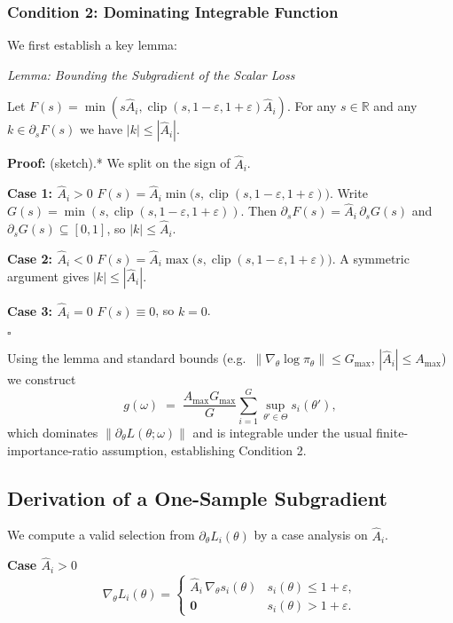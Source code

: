 \documentclass{article}
\begin{document}
\subsubsection{Condition 2: Dominating Integrable Function} 
We first establish a key lemma: 

\textit{Lemma: Bounding the Subgradient of the Scalar Loss} 

Let $F(s)=\min(s\hat{A}_i,\operatorname{clip}(s,1-\varepsilon,1+\varepsilon)\hat{A}_i)$.  
For any $s\in\mathbb{R}$ and any $k\in\partial_s F(s)$ we have $|k|\le|\hat{A}_i|$.

\textbf{Proof:} (sketch).* We split on the sign of $\hat{A}_i$.

\textbf{Case 1: $\hat{A}_i>0$}
  $F(s)=\hat{A}_i\min\!\bigl(s,\operatorname{clip}(s,1-\varepsilon,1+\varepsilon)\bigr)$.  
  Write $G(s)=\min(s,\operatorname{clip}(s,1-\varepsilon,1+\varepsilon))$.  
  Then $\partial_s F(s)=\hat{A}_i\,\partial_s G(s)$ and  
  $\partial_s G(s)\subseteq[0,1]$, so $|k|\le\hat{A}_i$.

\textbf{Case 2: $\hat{A}_i<0$}
  $F(s)=\hat{A}_i\max\!\bigl(s,\operatorname{clip}(s,1-\varepsilon,1+\varepsilon)\bigr)$.  
  A symmetric argument gives $|k|\le|\hat{A}_i|$.

\textbf{Case 3: $\hat{A}_i=0$}  
  $F(s)\equiv0$, so $k=0$.

\(\square\)

Using the lemma and standard bounds (e.g.\ $\|\nabla_\theta\log\pi_\theta\|\le G_{\max}$, $|\hat{A}_i|\le A_{\max}$) we construct
\[
g(\omega)\;=\;
\frac{A_{\max}G_{\max}}{G}
\sum_{i=1}^G\sup_{\theta'\in\Theta}s_i(\theta'),
\]
which dominates $\|\partial_\theta L(\theta;\omega)\|$ and is integrable under the usual finite-importance-ratio assumption, establishing Condition 2.

\subsection{Derivation of a One-Sample Subgradient}

We compute a valid selection from $\partial_\theta L_i(\theta)$ by a case analysis on $\hat{A}_i$.

\textbf{Case $\hat{A}_i>0$}
  \[
  \nabla_\theta L_i(\theta)=
  \begin{cases}
  \hat{A}_i\,\nabla_\theta s_i(\theta) & s_i(\theta)\le 1+\varepsilon,\\[4pt]
  \mathbf{0} & s_i(\theta)>1+\varepsilon.
  \end{cases}
  \]
\end{document}

